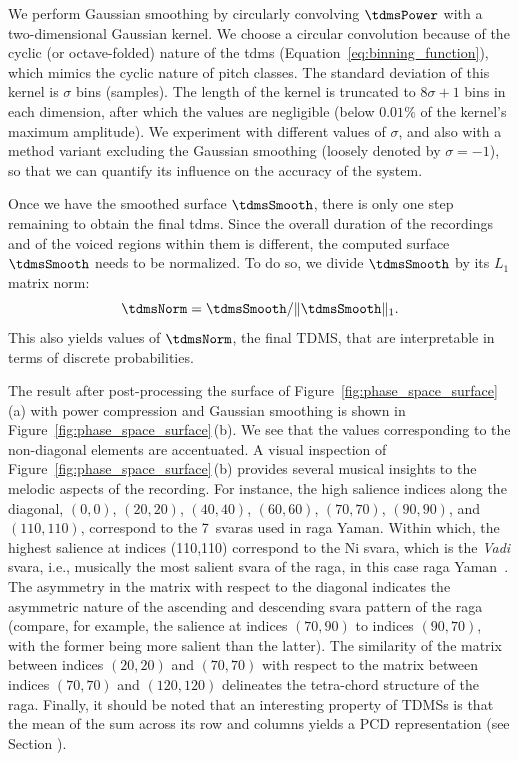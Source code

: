 We perform Gaussian smoothing by circularly convolving $\tdmsPower$ with a two-dimensional Gaussian kernel. We choose a circular convolution because of the cyclic (or octave-folded) nature of the \gls{tdms} (Equation~\ref{eq:binning_function}), which mimics the cyclic nature of pitch classes. The standard deviation of this kernel is $\sigma$ bins (samples). The length of the kernel is truncated to $8\sigma + 1$ bins in each dimension, after which the values are negligible (below $0.01\%$ of the kernel's maximum amplitude). We experiment with different values of $\sigma$, and also with a method variant excluding the Gaussian smoothing (loosely denoted by $\sigma = -1$), so that we can quantify its influence on the accuracy of the system. 
%

Once we have the smoothed surface $\tdmsSmooth$, there is only one step remaining to obtain the final \gls{tdms}. Since the overall duration of the recordings and of the voiced regions within them is different, the computed surface $\tdmsSmooth$ needs to be normalized. To do so, we divide $\tdmsSmooth$ by its $L_1$ matrix norm:
\begin{equation*}
\tdmsNorm = \tdmsSmooth/\norm{\tdmsSmooth}_{1} .
\end{equation*}
This also yields values of $\tdmsNorm$, the final TDMS, that are interpretable in terms of discrete probabilities.

The result after post-processing the surface of Figure~\ref{fig:phase_space_surface}\,(a) with power compression and Gaussian smoothing is shown in Figure~\ref{fig:phase_space_surface}\,(b). We see that the values corresponding to the non-diagonal elements are accentuated. A visual inspection of Figure~\ref{fig:phase_space_surface}\,(b) provides several musical insights to the melodic aspects of the recording. For instance, the high salience indices along the diagonal, $(0,0)$, $(20,20)$, $(40,40)$, $(60,60)$, $(70,70)$, $(90,90)$, and $(110,110)$, correspond to the 7~svaras used in \gls{raga} Yaman. Within which, the highest salience at indices (110,110) correspond to the Ni svara, which is the {\it Vadi} svara, i.e., musically the most salient svara of the \gls{raga}, in this case \gls{raga} Yaman~\cite{rao1999raga}. The asymmetry in the matrix with respect to the diagonal indicates the asymmetric nature of the ascending and descending svara pattern of the \gls{raga} (compare, for example, the salience at indices $(70, 90)$ to indices $(90, 70)$, with the former being more salient than the latter). The similarity of the matrix between indices $(20,20)$ and $(70,70)$ with respect to the matrix between indices $(70,70)$ and $(120,120)$ delineates the tetra-chord structure of the \gls{raga}. Finally, it should be noted that an interesting property of TDMSs is that the mean of the sum across its row and columns yields a PCD representation (see Section ).

